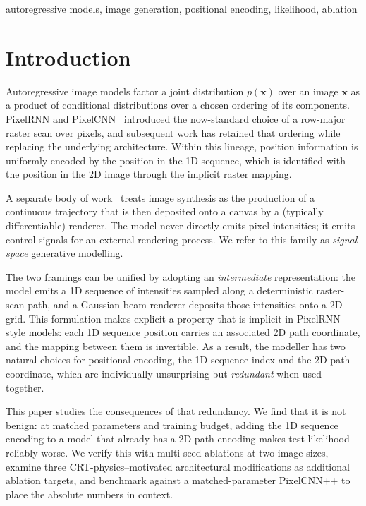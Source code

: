 \documentclass[conference]{IEEEtran}
\begin{document}
\begin{IEEEkeywords}
autoregressive models, image generation, positional encoding,
likelihood, ablation
\end{IEEEkeywords}

\section{Introduction}

Autoregressive image models factor a joint distribution
$p(\mathbf{x})$ over an image $\mathbf{x}$ as a product of conditional
distributions over a chosen ordering of its components. PixelRNN and
PixelCNN~\cite{vandenoord2016pixelrnn} introduced the now-standard
choice of a row-major raster scan over pixels, and subsequent work
\cite{salimans2017pixelcnnpp,parmar2018imagetransformer,chen2020generative}
has retained that ordering while replacing the underlying architecture.
Within this lineage, position information is uniformly encoded by
the position in the 1D sequence, which is identified with the
position in the 2D image through the implicit raster mapping.

A separate body of work~\cite{ha2017sketchrnn,
ganin2018spiral,liu2021painttransformer,frans2021clipdraw,jain2023vectorfusion}
treats image synthesis as the production of a continuous trajectory
that is then deposited onto a canvas by a (typically differentiable)
renderer. The model never directly emits pixel intensities; it emits
control signals for an external rendering process. We refer to this
family as \emph{signal-space} generative modelling.

The two framings can be unified by adopting an \emph{intermediate}
representation: the model emits a 1D sequence of intensities sampled
along a deterministic raster-scan path, and a Gaussian-beam renderer
deposits those intensities onto a 2D grid. This formulation makes
explicit a property that is implicit in PixelRNN-style models: each
1D sequence position carries an associated 2D path coordinate, and
the mapping between them is invertible. As a result, the modeller
has two natural choices for positional encoding, the 1D sequence
index and the 2D path coordinate, which are individually unsurprising
but \emph{redundant} when used together.

This paper studies the consequences of that redundancy. We find
that it is not benign: at matched parameters and training budget,
adding the 1D sequence encoding to a model that already has a 2D
path encoding makes test likelihood reliably worse. We verify this
with multi-seed ablations at two image sizes, examine three
CRT-physics--motivated architectural modifications as additional
ablation targets, and benchmark against a matched-parameter
PixelCNN++ to place the absolute numbers in context.
\end{document}
